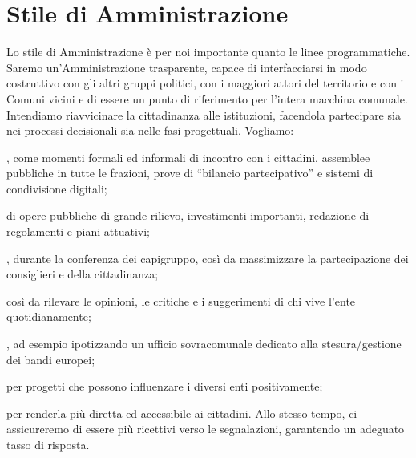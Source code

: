 \section{Stile di Amministrazione}
Lo stile di Amministrazione è per noi importante quanto le linee programmatiche. Saremo un'Amministrazione trasparente, capace di interfacciarsi in modo costruttivo con gli altri gruppi politici, con i maggiori attori del territorio e con i Comuni vicini e di essere un punto di riferimento per l'intera macchina comunale. Intendiamo riavvicinare la cittadinanza alle istituzioni, facendola partecipare sia nei processi decisionali sia nelle fasi progettuali. Vogliamo:

, come momenti formali ed informali di incontro con i cittadini, assemblee pubbliche in tutte le frazioni, prove di ``bilancio partecipativo'' e sistemi di condivisione digitali;

 di opere pubbliche di grande rilievo, investimenti importanti, redazione di regolamenti e piani attuativi;

, durante la conferenza dei capigruppo, così da massimizzare la partecipazione dei consiglieri e della cittadinanza;

 così da rilevare le opinioni, le critiche e i suggerimenti di chi vive l'ente quotidianamente;

, ad esempio ipotizzando un ufficio sovracomunale dedicato alla stesura/gestione dei bandi europei;

 per progetti che possono influenzare i diversi enti positivamente;

 per renderla più diretta ed accessibile ai cittadini. Allo stesso tempo, ci assicureremo di essere più ricettivi verso le segnalazioni, garantendo un adeguato tasso di risposta.

